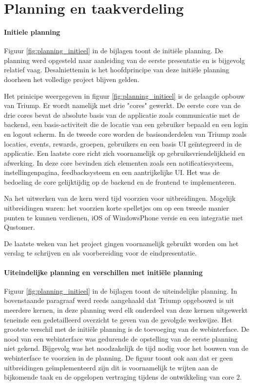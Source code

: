 
\chapter{Planning en taakverdeling}


\subsubsection{Initiele planning}

Figuur \ref{fig:planning_initieel} in de bijlagen toont de initiële planning. De planning werd opgesteld naar aanleiding van de eerste presentatie en is bijgevolg relatief vaag. Desalniettemin is het hoofdprincipe van deze initiële planning doorheen het volledige project blijven gelden. 

Het prinicipe weergegeven in figuur \ref{fig:planning_initieel} is de gelaagde opbouw van Triump. Er wordt namelijk met drie "cores" gewerkt. De eerste core van de drie cores bevat de absolute basis van de applicatie zoals communicatie met de backend, een basis-activiteit die de locatie van een gebruiker bepaald en een login en logout scherm. In de tweede core worden de basisonderdelen van Triump zoals locaties, events, rewards, groepen, gebruikers en een basis UI geïntegreerd in de applicatie. Een laatste core richt zich voornamelijk op gebruiksvriendelijkheid en afwerking. In deze core bevinden zich elementen zoals een notificatiesysteem, instellingenpagina, feedbacksysteem en een aantrijkelijke UI. Het was de bedoeling de core gelijktijdig op de backend en de frontend te implementeren.

Na het uitwerken van de kern werd tijd voorzien voor uitbreidingen. Mogelijk uitbreidingen waren: het voorzien korte spelletjes om op een tweede manier punten te kunnen verdienen, iOS of WindowsPhone versie en een integratie met Qustomer. 

De laatste weken van het project gingen voornamelijk gebruikt worden om het verslag te schrijven en als voorbereiding voor de eindpresentatie.

\subsubsection{Uiteindelijke planning en verschillen met initiële planning}

Figuur \ref{fig:planning_initieel} in de bijlagen toont de uiteindelijke planning. In bovenstaande paragraaf werd reeds aangehaald dat Triump opgebouwd is uit meerdere kernen, in deze planning werd elk onderdeel van deze kernen uitgewerkt teneinde een gedetailleerd overzicht te geven van de gevolgde werkwijze. Het grootste verschil met de initiële planning is de toevoeging van de webinterface. De nood van een webinterface was gedurende de opstelling van de eerste planning niet gekend. Bijgevolg was het noodzakelijk de tijd nodig voor het bouwen van de webinterface te voorzien in de planning. 
De figuur toont ook aan dat er geen uitbreidingen geïmplementeerd zijn dit is voornamelijk te wijten aan de bijkomende taak en de opgelopen vertraging tijdens de ontwikkeling van core 2.

